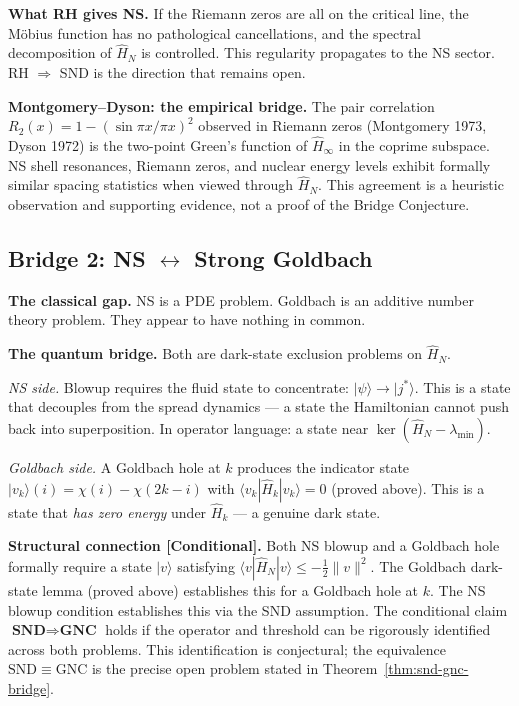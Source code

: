 \documentclass[12pt]{article}
\newcommand{\ket}[1]{|{#1}\rangle}
\newcommand{\bra}[1]{\langle{#1}|}
\begin{document}
\textbf{What RH gives NS.}
If the Riemann zeros are all on the critical line,
the M\"{o}bius function has no pathological cancellations,
and the spectral decomposition of $\hat{H}_N$ is controlled.
This regularity propagates to the NS sector.
RH $\Rightarrow$ SND is the direction that remains open.

\medskip
\textbf{Montgomery--Dyson: the empirical bridge.}
The pair correlation $R_2(x) = 1 - (\sin\pi x/\pi x)^2$
observed in Riemann zeros (Montgomery 1973, Dyson 1972)
is the two-point Green's function of $\hat{H}_\infty$ in the coprime subspace.
NS shell resonances, Riemann zeros, and nuclear energy levels
exhibit formally similar spacing statistics when viewed through $\hat{H}_N$.
This agreement is a heuristic observation and supporting evidence,
not a proof of the Bridge Conjecture.

\subsection{Bridge 2: NS $\longleftrightarrow$ Strong Goldbach}
\label{sec:bridge-goldbach}

\textbf{The classical gap.}
NS is a PDE problem.
Goldbach is an additive number theory problem.
They appear to have nothing in common.

\textbf{The quantum bridge.}
Both are dark-state exclusion problems on $\hat{H}_N$.

\medskip
\noindent\textit{NS side.}
Blowup requires the fluid state to concentrate: $\ket{\psi}\to\ket{j^*}$.
This is a state that decouples from the spread dynamics ---
a state the Hamiltonian cannot push back into superposition.
In operator language: a state near $\ker(\hat{H}_N - \lambda_{\min})$.

\noindent\textit{Goldbach side.}
A Goldbach hole at $k$ produces the indicator state
$\ket{v_k}(i) = \chi(i) - \chi(2k-i)$ with
$\bra{v_k}\hat{H}_k\ket{v_k} = 0$ (proved above).
This is a state that \emph{has zero energy} under $\hat{H}_k$ ---
a genuine dark state.

\begin{tcolorbox}[keybox]
\textbf{Structural connection [Conditional].}
Both NS blowup and a Goldbach hole formally require
a state $\ket{v}$ satisfying $\bra{v}\hat{H}_N\ket{v} \le -\tfrac{1}{2}\|v\|^2$.
The Goldbach dark-state lemma (proved above) establishes this for a Goldbach hole at $k$.
The NS blowup condition establishes this via the SND assumption.
The conditional claim $\textbf{SND} \Rightarrow \textbf{GNC}$ holds
if the operator and threshold can be rigorously identified across both problems.
This identification is conjectural; the equivalence $\mathrm{SND} \equiv \mathrm{GNC}$
is the precise open problem stated in Theorem~\ref{thm:snd-gnc-bridge}.
\end{tcolorbox}
\end{document}

